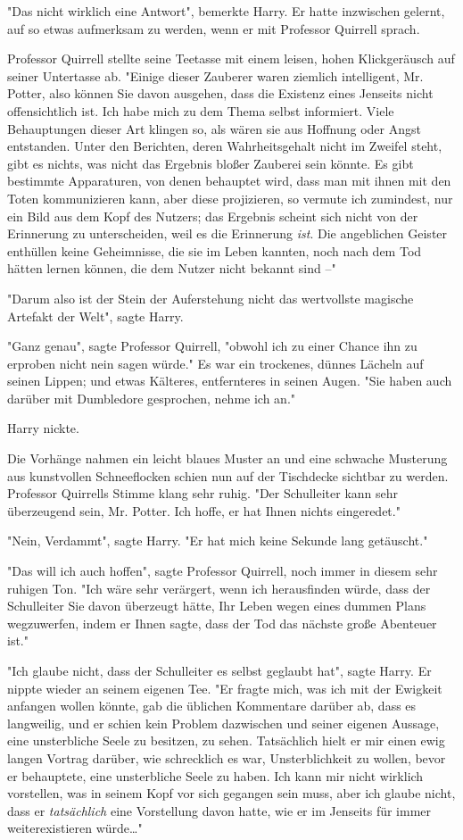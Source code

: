 {"Das nicht wirklich eine Antwort", bemerkte Harry. Er hatte inzwischen gelernt, auf so etwas aufmerksam zu werden, wenn er mit Professor Quirrell sprach.

Professor Quirrell stellte seine Teetasse mit einem leisen, hohen Klickgeräusch auf seiner Untertasse ab. "Einige dieser Zauberer waren ziemlich intelligent, Mr. Potter, also können Sie davon ausgehen, dass die Existenz eines Jenseits nicht offensichtlich ist. Ich habe mich zu dem Thema selbst informiert. Viele Behauptungen dieser Art klingen so, als wären sie aus Hoffnung oder Angst entstanden. Unter den Berichten, deren Wahrheitsgehalt nicht im Zweifel steht, gibt es nichts, was nicht das Ergebnis bloßer Zauberei sein könnte. Es gibt bestimmte Apparaturen, von denen behauptet wird, dass man mit ihnen mit den Toten kommunizieren kann, aber diese projizieren, so vermute ich zumindest, nur ein Bild aus dem Kopf des Nutzers; das Ergebnis scheint sich nicht von der Erinnerung zu unterscheiden, weil es die Erinnerung \emph{ist}. Die angeblichen Geister enthüllen keine Geheimnisse, die sie im Leben kannten, noch nach dem Tod hätten lernen können, die dem Nutzer nicht bekannt sind --"

"Darum also ist der Stein der Auferstehung nicht das wertvollste magische Artefakt der Welt", sagte Harry.

"Ganz genau", sagte Professor Quirrell, "obwohl ich zu einer Chance ihn zu erproben nicht nein sagen würde." Es war ein trockenes, dünnes Lächeln auf seinen Lippen; und etwas Kälteres, entfernteres in seinen Augen. "Sie haben auch darüber mit Dumbledore gesprochen, nehme ich an."

Harry nickte.

Die Vorhänge nahmen ein leicht blaues Muster an und eine schwache Musterung aus kunstvollen Schneeflocken schien nun auf der Tischdecke sichtbar zu werden. Professor Quirrells Stimme klang sehr ruhig. "Der Schulleiter kann sehr überzeugend sein, Mr. Potter. Ich hoffe, er hat Ihnen nichts eingeredet."

"Nein, Verdammt", sagte Harry. "Er hat mich keine Sekunde lang getäuscht."

"Das will ich auch hoffen", sagte Professor Quirrell, noch immer in diesem sehr ruhigen Ton. "Ich wäre sehr verärgert, wenn ich herausfinden würde, dass der Schulleiter Sie davon überzeugt hätte, Ihr Leben wegen eines dummen Plans wegzuwerfen, indem er Ihnen sagte, dass der Tod das nächste große Abenteuer ist."

"Ich glaube nicht, dass der Schulleiter es selbst geglaubt hat", sagte Harry. Er nippte wieder an seinem eigenen Tee. "Er fragte mich, was ich mit der Ewigkeit anfangen wollen könnte, gab die üblichen Kommentare darüber ab, dass es langweilig, und er schien kein Problem dazwischen und seiner eigenen Aussage, eine unsterbliche Seele zu besitzen, zu sehen. Tatsächlich hielt er mir einen ewig langen Vortrag darüber, wie schrecklich es war, Unsterblichkeit zu wollen, bevor er behauptete, eine unsterbliche Seele zu haben. Ich kann mir nicht wirklich vorstellen, was in seinem Kopf vor sich gegangen sein muss, aber ich glaube nicht, dass er \emph{tatsächlich} eine Vorstellung davon hatte, wie er im Jenseits für immer weiterexistieren würde…"

}
